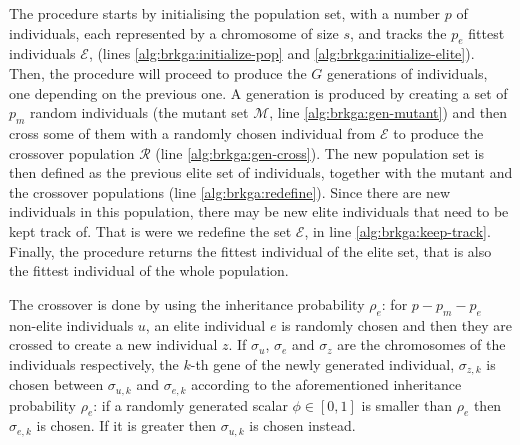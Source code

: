 \hfill

The procedure starts by initialising the population set, with a number $p$ of individuals,
each represented by a chromosome of size $s$, and tracks the $p_e$ fittest individuals
$\mathcal{E}$, (lines \ref{alg:brkga:initialize-pop} and \ref{alg:brkga:initialize-elite}).
Then, the procedure will proceed to produce the $G$ generations of individuals, one depending
on the previous one. A generation is produced by creating a set of $p_m$ random individuals
(the mutant set $\mathcal{M}$, line \ref{alg:brkga:gen-mutant}) and then cross some of them
with a randomly chosen individual from $\mathcal{E}$ to produce the crossover population
$\mathcal{R}$ (line \ref{alg:brkga:gen-cross}). The new population set is then defined as the
previous elite set of individuals, together with the mutant and the crossover populations
(line \ref{alg:brkga:redefine}). Since there are new individuals in this population, there may
be new elite individuals that need to be kept track of. That is were we redefine the set
$\mathcal{E}$, in line \ref{alg:brkga:keep-track}. Finally, the procedure returns the fittest
individual of the elite set, that is also the fittest individual of the whole population.

\hfill

The crossover is done by using the inheritance probability $\rho_e$: for $p - p_m - p_e$
non-elite individuals $u$, an elite individual $e$ is randomly chosen and then they are
crossed to create a new individual $z$. If $\sigma_u$, $\sigma_e$ and $\sigma_z$ are the
chromosomes of the individuals respectively, the $k$-th gene of the newly generated
individual, $\sigma_{z, k}$ is chosen between $\sigma_{u, k}$ and $\sigma_{e, k}$ according
to the aforementioned inheritance probability $\rho_e$: if a randomly generated scalar
$\phi \in [0, 1]$ is smaller than $\rho_e$ then $\sigma_{e, k}$ is chosen. If it is greater
then $\sigma_{u, k}$ is chosen instead.

\hfill

